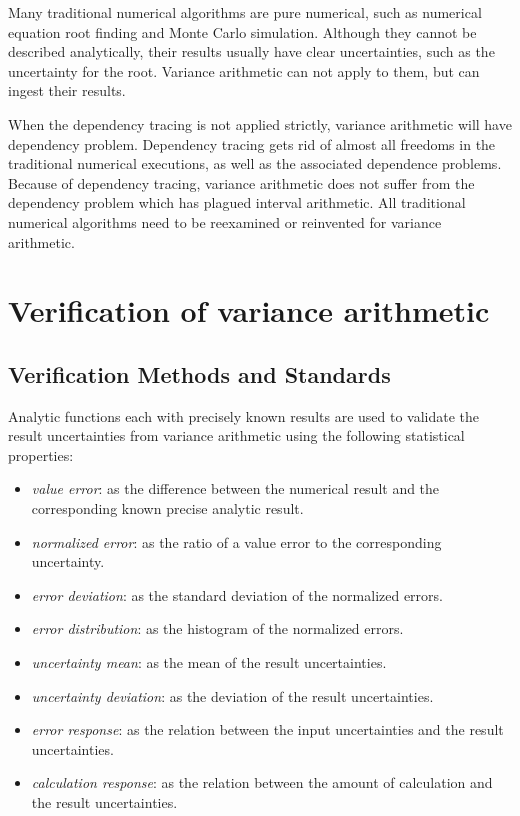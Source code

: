 \documentclass[twoside]{article}
\numberwithin{equation}{section}
\begin{document}
Many traditional numerical algorithms are pure numerical, such as numerical equation root finding and Monte Carlo simulation.
Although they cannot be described analytically, their results usually have clear uncertainties, such as the uncertainty for the root.
Variance arithmetic can not apply to them, but can ingest their results.

When the dependency tracing is not applied strictly, variance arithmetic will have dependency problem.
Dependency tracing gets rid of almost all freedoms in the traditional numerical executions, as well as the associated dependence problems.
Because of dependency tracing, variance arithmetic does not suffer from the dependency problem \cite{Interval_Arithmetic} which has plagued interval arithmetic.
All traditional numerical algorithms need to be reexamined or reinvented for variance arithmetic.








\clearpage
\section{Verification of variance arithmetic}
\label{sec: validation}

\subsection{Verification Methods and Standards}

Analytic functions each with precisely known results are used to validate the result uncertainties from variance arithmetic using the following statistical properties: 
\begin{itemize}

\item \emph{value error}: as the difference between the numerical result and the corresponding known precise analytic result.

\item \emph{normalized error}: as the ratio of a value error to the corresponding uncertainty.

\item \emph{error deviation}: as the standard deviation of the normalized errors.

\item \emph{error distribution}: as the histogram of the normalized errors.

\item \emph{uncertainty mean}: as the mean of the result uncertainties.

\item \emph{uncertainty deviation}: as the deviation of the result uncertainties.

\item \emph{error response}: as the relation between the input uncertainties and the result uncertainties.

\item \emph{calculation response}: as the relation between the amount of calculation and the result uncertainties.

\end{itemize}
\end{document}
